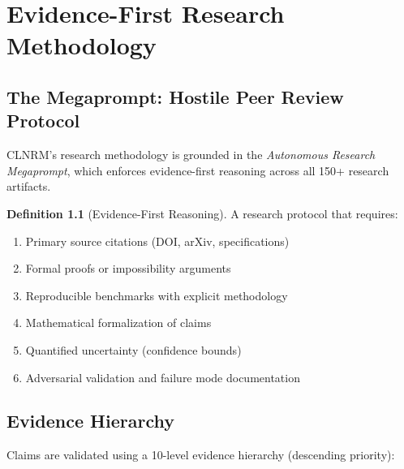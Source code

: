 \documentclass[12pt,twoside,openright]{book}
\theoremstyle{plain}
\theoremstyle{definition}
\newtheorem{definition}[theorem]{Definition}
\theoremstyle{remark}
\begin{document}
\chapter{Evidence-First Research Methodology}

\section{The Megaprompt: Hostile Peer Review Protocol}

CLNRM's research methodology is grounded in the \textit{Autonomous Research Megaprompt}, which enforces evidence-first reasoning across all 150+ research artifacts.

\begin{definition}[Evidence-First Reasoning]
A research protocol that requires:
\begin{enumerate}
  \item Primary source citations (DOI, arXiv, specifications)
  \item Formal proofs or impossibility arguments
  \item Reproducible benchmarks with explicit methodology
  \item Mathematical formalization of claims
  \item Quantified uncertainty (confidence bounds)
  \item Adversarial validation and failure mode documentation
\end{enumerate}
\end{definition}

\section{Evidence Hierarchy}

Claims are validated using a 10-level evidence hierarchy (descending priority):
\end{document}
